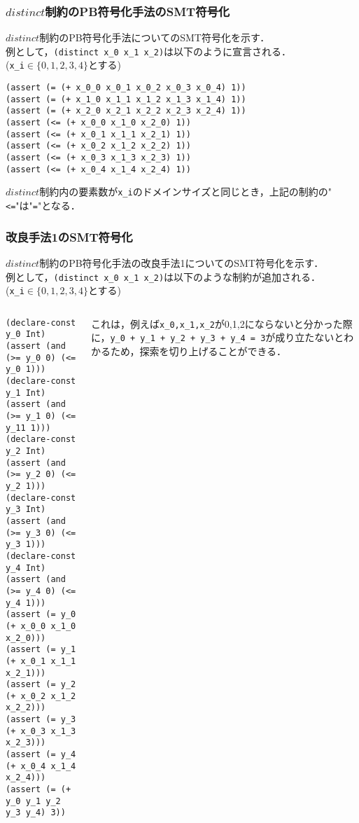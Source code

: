 \documentclass [dvipdfmx,12pt]{beamer}
\newcommand{\distinct}{$distinct$}
\begin{document}
\begin{frame}[fragile]
    \frametitle{\distinct 制約のPB符号化手法のSMT符号化}
    \distinct 制約のPB符号化手法についてのSMT符号化を示す．\\
    例として，\verb|(distinct x_0 x_1 x_2)|は以下のように宣言される．\\
    (\verb|x_i|$\in \{0,1,2,3,4\}$とする)
    \begin{exampleblock}{}\scriptsize
\begin{verbatim}
(assert (= (+ x_0_0 x_0_1 x_0_2 x_0_3 x_0_4) 1))
(assert (= (+ x_1_0 x_1_1 x_1_2 x_1_3 x_1_4) 1))
(assert (= (+ x_2_0 x_2_1 x_2_2 x_2_3 x_2_4) 1))
(assert (<= (+ x_0_0 x_1_0 x_2_0) 1))
(assert (<= (+ x_0_1 x_1_1 x_2_1) 1))
(assert (<= (+ x_0_2 x_1_2 x_2_2) 1))
(assert (<= (+ x_0_3 x_1_3 x_2_3) 1))
(assert (<= (+ x_0_4 x_1_4 x_2_4) 1))
\end{verbatim}
    \end{exampleblock}
    \distinct 制約内の要素数が\verb|x_i|のドメインサイズと同じとき，上記の制約の"\verb|<=|"は"\verb|=|"となる．
\end{frame}



\begin{frame}[fragile]\footnotesize
    \frametitle{改良手法1のSMT符号化}
    \distinct 制約のPB符号化手法の改良手法1についてのSMT符号化を示す．\\
    例として，\verb|(distinct x_0 x_1 x_2)|は以下のような制約が追加される．\\
    (\verb|x_i|$\in \{0,1,2,3,4\}$とする)

    \begin{columns}
        \begin{column}{0.5\textwidth}
            \begin{exampleblock}{}\scriptsize
\begin{verbatim}
(declare-const y_0 Int)
(assert (and (>= y_0 0) (<= y_0 1)))
(declare-const y_1 Int)
(assert (and (>= y_1 0) (<= y_11 1)))
(declare-const y_2 Int)
(assert (and (>= y_2 0) (<= y_2 1)))
(declare-const y_3 Int)
(assert (and (>= y_3 0) (<= y_3 1)))
(declare-const y_4 Int)
(assert (and (>= y_4 0) (<= y_4 1)))
(assert (= y_0 (+ x_0_0 x_1_0 x_2_0)))
(assert (= y_1 (+ x_0_1 x_1_1 x_2_1)))
(assert (= y_2 (+ x_0_2 x_1_2 x_2_2)))
(assert (= y_3 (+ x_0_3 x_1_3 x_2_3)))
(assert (= y_4 (+ x_0_4 x_1_4 x_2_4)))
(assert (= (+ y_0 y_1 y_2 y_3 y_4) 3))
\end{verbatim}
            \end{exampleblock}
        \end{column}
        \begin{column}{0.5\textwidth}\scriptsize
            これは，例えば\verb|x_0,x_1,x_2|が0,1,2にならないと分かった際に，\verb|y_0 + y_1 + y_2 + y_3 + y_4 = 3|が成り立たないとわかるため，探索を切り上げることができる．
        \end{column}
    \end{columns}
\end{frame}
\end{document}
